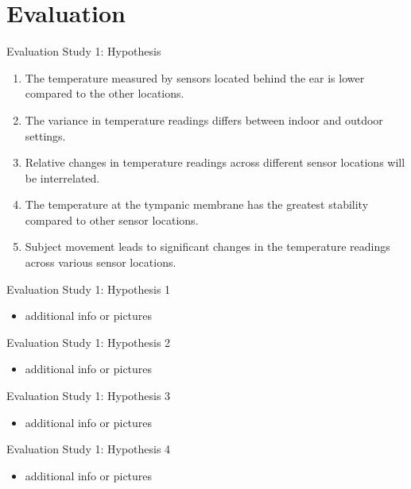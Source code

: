 \documentclass[en]{sdqbeamer}
\begin{document}
\section{Evaluation}
\begin{frame}{Evaluation Study 1: Hypothesis}
    \begin{enumerate}[label=H\arabic{*}:]
      \item The temperature measured by sensors located behind the ear is lower compared to the other locations.
      \item The variance in temperature readings differs between indoor and outdoor settings.
      \item Relative changes in temperature readings across different sensor locations will be interrelated.
      \item The temperature at the tympanic membrane has the greatest stability compared to other sensor locations.
      \item Subject movement leads to significant changes in the temperature readings across various sensor locations.
    \end{enumerate}
\end{frame}

\begin{frame}{Evaluation Study 1: Hypothesis 1}
    \begin{itemize}
        \item additional info or pictures
    \end{itemize}
\end{frame}

\begin{frame}{Evaluation Study 1: Hypothesis 2}
    \begin{itemize}
        \item additional info or pictures
    \end{itemize}
\end{frame}

\begin{frame}{Evaluation Study 1: Hypothesis 3}
    \begin{itemize}
        \item additional info or pictures
    \end{itemize}
\end{frame}

\begin{frame}{Evaluation Study 1: Hypothesis 4}
    \begin{itemize}
        \item additional info or pictures
    \end{itemize}
\end{frame}
\end{document}
